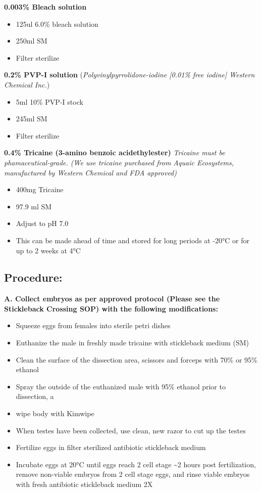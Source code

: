\documentclass[
]{book}
\providecommand{\tightlist}{%
  \setlength{\itemsep}{0pt}\setlength{\parskip}{0pt}}
\begin{document}
\textbf{0.003\% Bleach solution}

\begin{itemize}
\tightlist
\item
  125ul 6.0\% bleach solution
\item
  250ml SM
\item
  Filter sterilize
\end{itemize}

\textbf{0.2\% PVP-I solution} (\emph{Polyvinylpyrrolidone-iodine {[}0.01\% free iodine{]} Western Chemical Inc.})

\begin{itemize}
\tightlist
\item
  5ml 10\% PVP-I stock
\item
  245ml SM
\item
  Filter sterilize
\end{itemize}

\textbf{0.4\% Tricaine (3-amino benzoic acidethylester)}
\emph{Tricaine must be phamaceutical-grade. (We use tricaine purchased from Aquaic Ecosystems, manufactured by Western Chemical and FDA approved)}

\begin{itemize}
\tightlist
\item
  400mg Tricaine
\item
  97.9 ml SM
\item
  Adjust to pH 7.0
\item
  This can be made ahead of time and stored for long periods at -20°C or for up to 2 weeks at 4°C
\end{itemize}

\hypertarget{procedure-16}{%
\subsection{Procedure:}\label{procedure-16}}

\textbf{A. Collect embryos as per approved protocol (Please see the Stickleback Crossing SOP) with the following modifications:}

\begin{itemize}
\tightlist
\item
  Squeeze eggs from females into sterile petri dishes
\item
  Euthanize the male in freshly made tricaine with stickleback medium (SM)
\item
  Clean the surface of the dissection area, scissors and forceps with 70\% or 95\% ethanol
\item
  Spray the outside of the euthanized male with 95\% ethanol prior to dissection, a
\item
  wipe body with Kimwipe
\item
  When testes have been collected, use clean, new razor to cut up the testes
\item
  Fertilize eggs in filter sterilized antibiotic stickleback medium
\item
  Incubate eggs at 20°C until eggs reach 2 cell stage \textasciitilde2 hours post fertilization, remove non-viable embryos from 2 cell stage eggs, and rinse viable embryos with fresh antibiotic stickleback medium 2X
\end{itemize}
\end{document}
